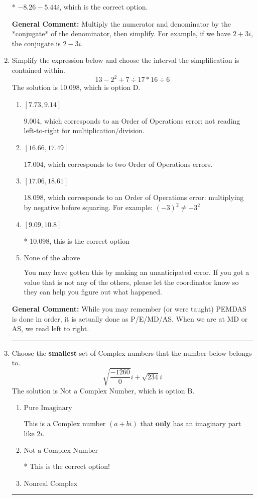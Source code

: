 \documentclass{extbook}[14pt]
\newcommand{\litem}[1]{\item #1

\rule{\textwidth}{0.4pt}}
\begin{document}
\begin{enumerate}
{\begin{enumerate}[label=\Alph*.]
* $-8.26  - 5.44 i$, which is the correct option.
\end{enumerate}

\textbf{General Comment:} Multiply the numerator and denominator by the *conjugate* of the denominator, then simplify. For example, if we have $2+3i$, the conjugate is $2-3i$.
}
\litem{
Simplify the expression below and choose the interval the simplification is contained within.
\[ 13 - 2^2 + 7 \div 17 * 16 \div 6 \]
The solution is \( 10.098 \), which is option D.\begin{enumerate}[label=\Alph*.]
\item \( [7.73, 9.14] \)

 9.004, which corresponds to an Order of Operations error: not reading left-to-right for multiplication/division.
\item \( [16.66, 17.49] \)

 17.004, which corresponds to two Order of Operations errors.
\item \( [17.06, 18.61] \)

 18.098, which corresponds to an Order of Operations error: multiplying by negative before squaring. For example: $(-3)^2 \neq -3^2$
\item \( [9.09, 10.8] \)

* 10.098, this is the correct option
\item \( \text{None of the above} \)

 You may have gotten this by making an unanticipated error. If you got a value that is not any of the others, please let the coordinator know so they can help you figure out what happened.
\end{enumerate}

\textbf{General Comment:} While you may remember (or were taught) PEMDAS is done in order, it is actually done as P/E/MD/AS. When we are at MD or AS, we read left to right.
}
\litem{
Choose the \textbf{smallest} set of Complex numbers that the number below belongs to.
\[ \sqrt{\frac{-1260}{0}} i+\sqrt{234}i \]
The solution is \( \text{Not a Complex Number} \), which is option B.\begin{enumerate}[label=\Alph*.]
\item \( \text{Pure Imaginary} \)

This is a Complex number $(a+bi)$ that \textbf{only} has an imaginary part like $2i$.
\item \( \text{Not a Complex Number} \)

* This is the correct option!
\item \( \text{Nonreal Complex} \)


\end{enumerate}}
\end{enumerate}
\end{document}
